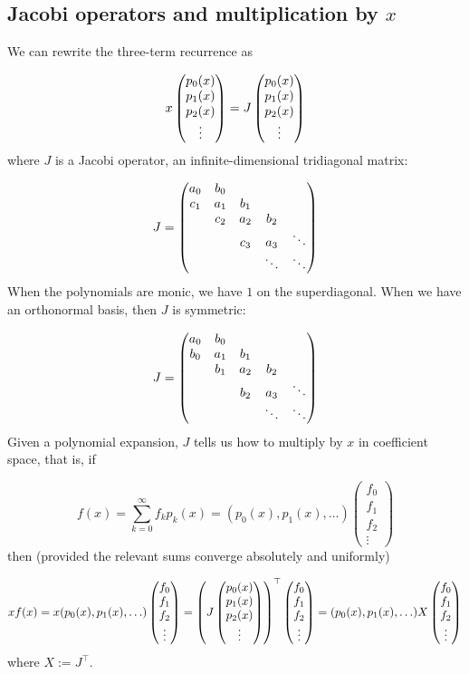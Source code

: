\documentclass[12pt,landscape]{article}
\begin{document}
{\subsection{Jacobi operators and multiplication by $x$}
We can rewrite the three-term recurrence as

\[
x \begin{pmatrix} p_0(x) \cr p_1(x) \cr p_2(x) \cr \vdots \end{pmatrix} = J\begin{pmatrix} p_0(x) \cr p_1(x) \cr p_2(x) \cr \vdots \end{pmatrix}
\]
where $J$ is a Jacobi operator, an infinite-dimensional tridiagonal matrix:

\[
J = \begin{pmatrix}
a_0 & b_0 \cr
c_1 & a_1 & b_1 \cr
& c_2 & a_2 & b_2 \cr
&& c_3 & a_3 & \ddots \cr
&&&\ddots & \ddots
\end{pmatrix}
\]
When the polynomials are monic, we have $1$ on the superdiagonal.  When we have an orthonormal basis, then $J$ is symmetric:

\[
J = \begin{pmatrix}
a_0 & b_0 \cr
b_0 & a_1 & b_1 \cr
& b_1 & a_2 & b_2 \cr
&& b_2 & a_3 & \ddots \cr
&&&\ddots & \ddots
\end{pmatrix}
\]
Given a polynomial expansion, $J$ tells us how to multiply by $x$ in coefficient space, that is, if

\[
f(x) = \sum_{k=0}^\infty f_k p_k(x) =   (p_0(x) ,  p_1(x) , \ldots ) \begin{pmatrix}f_0\\ f_1\\f_2\\\vdots\end{pmatrix}
\]
then (provided the relevant sums converge absolutely and uniformly)

\[
x f(x) = x (p_0(x) ,  p_1(x) , \ldots ) \begin{pmatrix}f_0\\ f_1\\f_2\\\vdots\end{pmatrix} =
    \left(J \begin{pmatrix} p_0(x) \cr p_1(x) \cr p_2(x) \cr \vdots \end{pmatrix}\right)^\top  \begin{pmatrix}f_0\\ f_1\\f_2\\\vdots\end{pmatrix} = (p_0(x) ,  p_1(x) , \ldots ) X \begin{pmatrix}f_0\\ f_1\\f_2\\\vdots\end{pmatrix}
\]
where $X := J^\top$.

}
\end{document}
